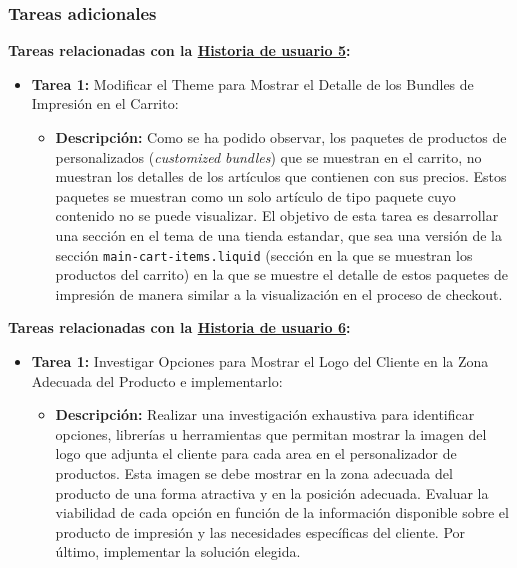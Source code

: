 \documentclass[11pt]{article}
\begin{document}
\subsubsection{Tareas adicionales}

\textbf{Tareas relacionadas con la \hyperref[sec:historia5]{Historia de usuario 5}:}
\begin{itemize}
    \item \textbf{Tarea 1:} Modificar el Theme para Mostrar el Detalle de los Bundles de Impresión en el Carrito:
          \begin{itemize}[label=--]
              \item \textbf{Descripción:} Como se ha podido observar, los paquetes de productos de personalizados (\textit{customized bundles}) que se muestran en el carrito, no muestran los detalles de los artículos que contienen con sus precios. Estos paquetes se muestran como un solo artículo de tipo paquete cuyo contenido no se puede visualizar. El objetivo de esta tarea es desarrollar una sección en el tema de una tienda estandar, que sea una versión de la sección \texttt{main-cart-items.liquid} (sección en la que se muestran los productos del carrito) en la que se muestre el detalle de estos paquetes de impresión de manera similar a la visualización en el proceso de checkout.
          \end{itemize}
\end{itemize}


\textbf{Tareas relacionadas con la \hyperref[sec:historia6]{Historia de usuario 6}:}
\begin{itemize}
    \item \textbf{Tarea 1:} Investigar Opciones para Mostrar el Logo del Cliente en la Zona Adecuada del Producto e implementarlo:
          \begin{itemize}[label=--]
              \item \textbf{Descripción:} Realizar una investigación exhaustiva para identificar opciones, librerías u herramientas que permitan mostrar la imagen del logo que adjunta el cliente para cada area en el personalizador de productos. Esta imagen se debe mostrar en la zona adecuada del producto de una forma atractiva y en la posición adecuada. Evaluar la viabilidad de cada opción en función de la información disponible sobre el producto de impresión y las necesidades específicas del cliente. Por último, implementar la solución elegida.
          \end{itemize}
\end{itemize}
\end{document}
